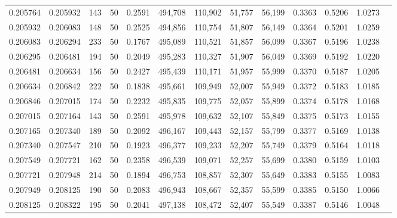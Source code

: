 \begin{tabular}{rrrrrrrrrrrrr}
0.205764 & 0.205932 &   143 &  50 &                                     0.2591 & 494,708 & 110,902 &  51,757 &  56,199 & 0.3363 & 0.5206 & 1.0273 \\
0.205932 & 0.206083 &   148 &  50 &                                     0.2525 & 494,856 & 110,754 &  51,807 &  56,149 & 0.3364 & 0.5201 & 1.0259 \\
0.206083 & 0.206294 &   233 &  50 &                                     0.1767 & 495,089 & 110,521 &  51,857 &  56,099 & 0.3367 & 0.5196 & 1.0238 \\
0.206295 & 0.206481 &   194 &  50 &                                     0.2049 & 495,283 & 110,327 &  51,907 &  56,049 & 0.3369 & 0.5192 & 1.0220 \\
0.206481 & 0.206634 &   156 &  50 &                                     0.2427 & 495,439 & 110,171 &  51,957 &  55,999 & 0.3370 & 0.5187 & 1.0205 \\
0.206634 & 0.206842 &   222 &  50 &                                     0.1838 & 495,661 & 109,949 &  52,007 &  55,949 & 0.3372 & 0.5183 & 1.0185 \\
0.206846 & 0.207015 &   174 &  50 &                                     0.2232 & 495,835 & 109,775 &  52,057 &  55,899 & 0.3374 & 0.5178 & 1.0168 \\
0.207015 & 0.207164 &   143 &  50 &                                     0.2591 & 495,978 & 109,632 &  52,107 &  55,849 & 0.3375 & 0.5173 & 1.0155 \\
0.207165 & 0.207340 &   189 &  50 &                                     0.2092 & 496,167 & 109,443 &  52,157 &  55,799 & 0.3377 & 0.5169 & 1.0138 \\
0.207340 & 0.207547 &   210 &  50 &                                     0.1923 & 496,377 & 109,233 &  52,207 &  55,749 & 0.3379 & 0.5164 & 1.0118 \\
0.207549 & 0.207721 &   162 &  50 &                                     0.2358 & 496,539 & 109,071 &  52,257 &  55,699 & 0.3380 & 0.5159 & 1.0103 \\
0.207721 & 0.207948 &   214 &  50 &                                     0.1894 & 496,753 & 108,857 &  52,307 &  55,649 & 0.3383 & 0.5155 & 1.0083 \\
0.207949 & 0.208125 &   190 &  50 &                                     0.2083 & 496,943 & 108,667 &  52,357 &  55,599 & 0.3385 & 0.5150 & 1.0066 \\
0.208125 & 0.208322 &   195 &  50 &                                     0.2041 & 497,138 & 108,472 &  52,407 &  55,549 & 0.3387 & 0.5146 & 1.0048 \\

\end{tabular}
